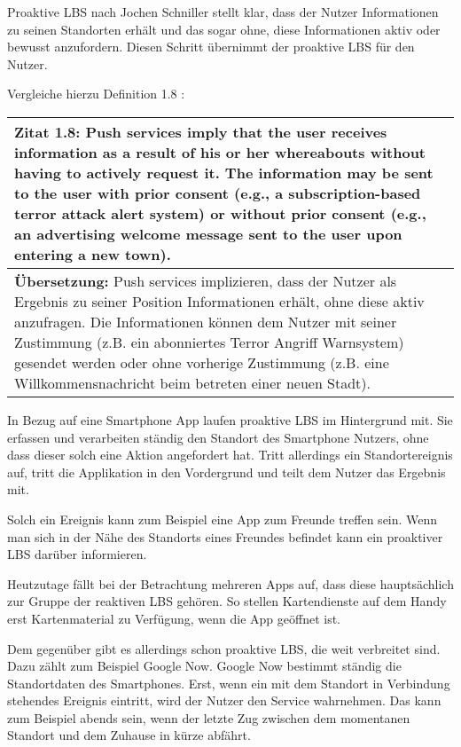 Proaktive LBS nach Jochen Schniller stellt klar, dass der Nutzer Informationen zu seinen Standorten erhält und das sogar ohne, diese Informationen aktiv oder bewusst anzufordern. Diesen Schritt übernimmt der proaktive LBS für den Nutzer.

Vergleiche hierzu Definition 1.8 :

\begin{table}[h]
	\centering
	\begin{tabular}{|p{16cm}|}\hline
		\textbf{Zitat 1.8:} \glqq Push services imply that the user receives information as a result of his or her whereabouts without having to actively request it. The information may be sent to the user with prior consent (e.g., a subscription-based terror attack alert system) or without prior consent (e.g., an advertising welcome message sent to the user upon entering a new town). \grqq \cite[S.20]{Schiller2004} \\ \hline
		\textbf{Übersetzung:} Push services implizieren, dass der Nutzer als Ergebnis zu seiner Position Informationen erhält, ohne diese aktiv anzufragen. Die Informationen können dem Nutzer mit seiner  Zustimmung (z.B. ein abonniertes Terror Angriff Warnsystem) gesendet werden oder ohne vorherige Zustimmung (z.B. eine Willkommensnachricht beim betreten einer neuen Stadt).\\ \hline
	\end{tabular}
\end{table}

In Bezug auf eine Smartphone App laufen proaktive LBS im Hintergrund mit. Sie erfassen und verarbeiten ständig den Standort des Smartphone Nutzers, ohne dass dieser solch eine Aktion angefordert hat. Tritt allerdings ein Standortereignis auf, tritt die Applikation in den Vordergrund und teilt dem Nutzer das Ergebnis mit. 

Solch ein Ereignis kann zum Beispiel eine App zum Freunde treffen sein. Wenn man sich in der Nähe des Standorts eines Freundes befindet kann ein proaktiver LBS darüber informieren. 


Heutzutage fällt bei der Betrachtung mehreren Apps auf, dass diese hauptsächlich zur Gruppe der reaktiven LBS gehören. So stellen Kartendienste auf dem Handy erst Kartenmaterial zu Verfügung, wenn die App geöffnet ist. 

Dem gegenüber gibt es allerdings schon proaktive LBS, die weit verbreitet sind. Dazu zählt zum Beispiel Google Now. Google Now bestimmt ständig die Standortdaten des Smartphones. Erst, wenn ein mit dem Standort in Verbindung stehendes Ereignis eintritt, wird der Nutzer den Service wahrnehmen. Das kann zum Beispiel abends sein, wenn der letzte Zug zwischen dem momentanen Standort und dem Zuhause in kürze abfährt.
